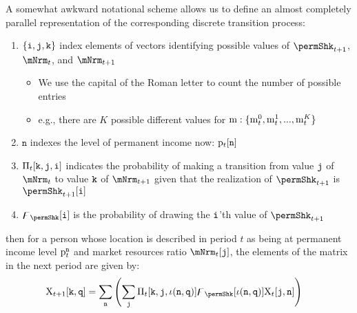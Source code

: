 \documentclass[\econtexRoot/BufferStockTheory]{subfiles}
\begin{document}
\newcommand{\npermLvlVecNow}{\texttt{n}}\newcommand{\npermLvlVecNxt}{\texttt{q}}\newcommand{\nPermShkNxtFunc}{\iota(\npermLvlVecNow,\npermLvlVecNxt)}\newcommand{\nPermShkVecNxt}{\texttt{i}}
\newcommand{\mNrmVecNow}{\mNrmVec_{t}^{\nmNrmVecNow}}
\newcommand{\mNrmVecNxt}{\mNrmVec_{t+1}^{\nmNrmVecNxt}}
\newcommand{\permShkVecNxt}{\permShk_{t+1}^{\nPermShkVecNxt}}
\newcommand{\permShkVecNow}{\permShk_{t}^{\nPermShkVecNow}}
\newcommand{\permLvlNow}{\permLvlPrb_{t}}
\newcommand{\permLvlNxt}{\permLvlPrb_{t+1}}
\newcommand{\permLvlVecNow}{\permLvlVec_{t}^{\npermLvlVecNow}}
\newcommand{\permLvlVecNxt}{\permLvlVec_{t+1}^{\npermLvlVecNxt}}

\noindent A somewhat awkward notational scheme allows us to define an almost completely parallel representation of the corresponding discrete transition process:
\begin{enumerate}
\item $\{\texttt{i}, \texttt{j}, \texttt{k}\}$ index elements of vectors identifying possible values of $\permShkPrbNxt$, $\mNrmNow$, and $\mNrmNxt$
  \begin{itemize}
  \item We use the capital of the Roman letter to count the number of possible entries
    \item e.g., there are $K$ possible different values for $\mathrm{m}:\{\mathrm{m}_{t}^{0},\mathrm{m}_{t}^{1},...,\mathrm{m}_{t}^{K}\}$
    \end{itemize}
\item $\npermLvlVecNow$ indexes the level of permanent income now: $\permLvlVec_{t}[\npermLvlVecNow]$
\item$\Pi_{t}[\texttt{k},\texttt{j},\texttt{i}]$ indicates the probability of making a transition from value $\texttt{j}$ of $\mNrmNow$ to value $\texttt{k}$ of $\mNrmNxt$ given that the realization of $\permShkPrbNxt$ is $\permShkPrbNxt[\nPermShk]$
\item $\permShkVec[\nPermShk]$ is the probability of drawing the $\texttt{i}$'th value of $\permShkPrbNxt$
\end{enumerate}
then for a person whose location is described in period $t$ as being at permanent income level $\permLvlVecNow$ and market resources ratio $\mNrmNow[\nmNrmVecNow]$, the elements of the matrix in the next period are given by:
\begin{equation}\begin{aligned} \label{eq:mpMattp1}
  \mpMat_{t+1}[\nmNrmVecNxt,\npermLvlVecNxt] & = \sum_{\npermLvlVecNow} \left(\sum_{\nmNrmVecNow} \lomdkMat_{t}[\nmNrmVecNxt,\nmNrmVecNow,\nPermShkNxtFunc]\permShkVec[\nPermShkNxtFunc]\mpMat_{t}[\nmNrmVecNow,\npermLvlVecNow]  \right)
\end{aligned}\end{equation}
\end{document}
